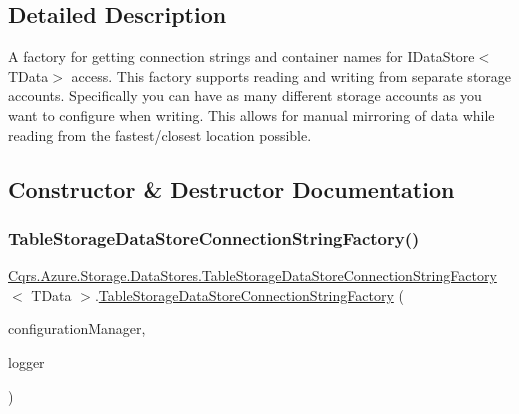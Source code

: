 \subsection{Detailed Description}
A factory for getting connection strings and container names for I\+Data\+Store$<$\+T\+Data$>$ access. This factory supports reading and writing from separate storage accounts. Specifically you can have as many different storage accounts as you want to configure when writing. This allows for manual mirroring of data while reading from the fastest/closest location possible. 



\subsection{Constructor \& Destructor Documentation}
\mbox{\label{classCqrs_1_1Azure_1_1Storage_1_1DataStores_1_1TableStorageDataStoreConnectionStringFactory_a72218c0219be3c3185ae98893f0d91e3_a72218c0219be3c3185ae98893f0d91e3}} 
\subsubsection{\texorpdfstring{Table\+Storage\+Data\+Store\+Connection\+String\+Factory()}{TableStorageDataStoreConnectionStringFactory()}}
{\footnotesize\ttfamily \hyperlink{classCqrs_1_1Azure_1_1Storage_1_1DataStores_1_1TableStorageDataStoreConnectionStringFactory}{Cqrs.\+Azure.\+Storage.\+Data\+Stores.\+Table\+Storage\+Data\+Store\+Connection\+String\+Factory}$<$ T\+Data $>$.\hyperlink{classCqrs_1_1Azure_1_1Storage_1_1DataStores_1_1TableStorageDataStoreConnectionStringFactory}{Table\+Storage\+Data\+Store\+Connection\+String\+Factory} (\begin{DoxyParamCaption}\item[{\hyperlink{interfaceCqrs_1_1Configuration_1_1IConfigurationManager}{I\+Configuration\+Manager}}]{configuration\+Manager,  }\item[{I\+Logger}]{logger }\end{DoxyParamCaption})}



